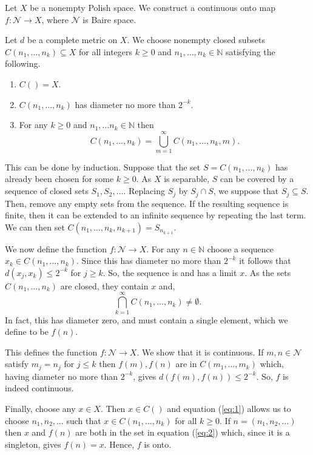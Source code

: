 \documentclass[12pt]{article}
\begin{document}

Let $X$ be a nonempty Polish space. We construct a continuous onto map $f\colon \mathcal{N}\rightarrow X$, where $\mathcal{N}$ is Baire space.

Let $d$ be a complete metric on $X$.
We choose nonempty closed subsets $C(n_1,\ldots,n_k)\subseteq X$ for all integers $k\ge 0$ and $n_1,\ldots,n_k\in\mathbb{N}$ satisfying the following.
\begin{enumerate}
\item $C()=X$.
\item $C(n_1,\ldots,n_k)$ has diameter no more than $2^{-k}$.
\item For any $k\ge 0$ and $n_1,\ldots n_k\in\mathbb{N}$ then
\begin{equation}\label{eq:1}
C(n_1,\ldots,n_k)=\bigcup_{m=1}^\infty C(n_1,\ldots,n_k,m).
\end{equation}
\end{enumerate}
This can be done by induction. Suppose that the set $S=C(n_1,\ldots,n_k)$ has already been chosen for some $k\ge 0$. As $X$ is separable, $S$ can be covered by a sequence of closed sets $S_1,S_2,\ldots$. Replacing $S_j$ by $S_j\cap S$, we suppose that $S_j\subseteq S$. Then, remove any empty sets from the sequence. If the resulting sequence is finite, then it can be extended to an infinite sequence by repeating the last term.
We can then set $C(n_1,\ldots,n_k,n_{k+1})=S_{n_{k+1}}$.

We now define the function $f\colon\mathcal{N}\rightarrow X$. For any $n\in\mathbb{N}$ choose a sequence $x_k\in C(n_1,\ldots,n_k)$. Since this has diameter no more than $2^{-k}$ it follows that $d(x_j,x_k)\le 2^{-k}$ for $j\ge k$. So, the sequence is  and has a limit $x$. As the sets $C(n_1,\ldots,n_k)$ are closed, they contain $x$ and,
\begin{equation}\label{eq:2}
\bigcap_{k=1}^\infty C(n_1,\ldots,n_k)\not=\emptyset.
\end{equation}
In fact, this has diameter zero, and must contain a single element, which we define to be $f(n)$.

This defines the function $f\colon\mathcal{N}\rightarrow X$. We show that it is continuous. If $m,n\in\mathcal{N}$ satisfy $m_j=n_j$ for $j\le k$ then $f(m),f(n)$ are in $C(m_1,\ldots,m_k)$ which, having diameter no more than $2^{-k}$, gives $d(f(m),f(n))\le 2^{-k}$. So, $f$ is indeed continuous.

Finally, choose any $x\in X$. Then $x\in C()$ and equation (\ref{eq:1}) allows us to choose $n_1,n_2,\ldots$ such that $x\in C(n_1,\ldots,n_k)$ for all $k\ge 0$. If $n=(n_1,n_2,\ldots)$ then $x$ and $f(n)$ are both in the set in equation (\ref{eq:2}) which, since it is a singleton, gives $f(n)=x$. Hence, $f$ is onto.

\end{document}
